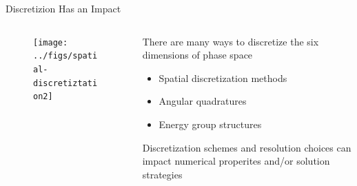 \documentclass[xcolor=x11names,compress]{beamer}
\renewcommand{\(}{\begin{columns}}
\renewcommand{\)}{\end{columns}}
\newcommand{\<}[1]{\begin{column}{#1}}
\renewcommand{\>}{\end{column}}
\begin{document}
\begin{frame}{Discretizion Has an Impact}

    \begin{columns}
    \begin{column}{0.45\textwidth}
        \begin{center}
 	    \begin{figure}
 	    \texttt{[image: ../figs/spatial-discretiztation2]}
        \end{figure}
 	    \end{center}
  	\end{column}
 	\begin{column}{0.5\textwidth}
        There are many ways to \textcolor{dgreen}{discretize} the six dimensions of 
        phase space
        \begin{itemize}
        \item Spatial discretization methods
        \item Angular quadratures
        \item Energy group structures
        \end{itemize}
    
        \vspace*{1 em}
        \textcolor{dgreen}{Discretization} schemes and resolution choices can impact 
        numerical properites and/or solution strategies
  	\end{column}
	\end{columns}
 
\end{frame}
\end{document}
